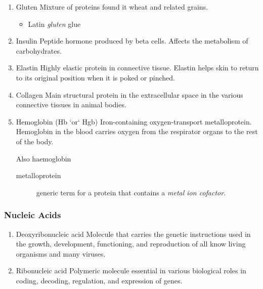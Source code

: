\documentclass[11pt]{article}
\begin{document}
\begin{enumerate}
\item Gluten
\label{sec:orgb977ee1}
Mixture of proteins found it wheat and related grains.

\begin{itemize}
\item Latin \emph{gluten} glue
\end{itemize}

\item Insulin
\label{sec:org9d0c5b8}
Peptide hormone produced by beta cells. Affects the metabolism of
carbohydrates.

\item Elastin
\label{sec:orgf2c3b90}
Highly elastic protein in connective tissue. Elastin helps skin to return
to its original position when it is poked or pinched.

\item Collagen
\label{sec:org7fddd30}
Main structural protein in the extracellular space in the various
connective tissues in animal bodies.

\item Hemoglobin (Hb `or` Hgb)
\label{sec:org79e368e}
Iron-containing oxygen-transport metalloprotein. Hemoglobin in the blood
carries oxygen from the respirator organs to the rest of the body.

Also haemoglobin

\begin{description}
\item[{metalloprotein}] generic term for a protein that contains a \emph{metal ion
cofactor}.
\end{description}
\end{enumerate}

\subsubsection{Nucleic Acids}
\label{sec:org61c554e}
\begin{enumerate}
\item Deoxyribonucleic acid
\label{sec:org9458e10}
Molecule that carries the genetic instructions used in the growth,
development, functioning, and reproduction of all know living organisms and
many viruses.

\item Ribonucleic acid
\label{sec:org55a0135}
Polymeric molecule essential in various biological roles in coding,
decoding, regulation, and expression of genes.
\end{enumerate}
\end{document}
